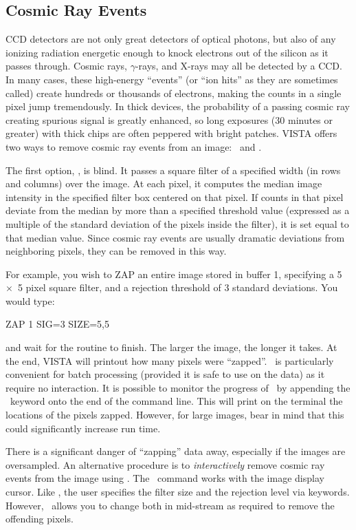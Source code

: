 \subsection{Cosmic Ray Events}
\label{sec:imcosrays}
CCD detectors are not only great detectors of optical photons, but also of any
ionizing radiation energetic enough to knock electrons out of the silicon as
it passes through.  Cosmic rays, $\gamma$-rays, and X-rays may all be detected
by a CCD.  In many cases, these high-energy ``events'' (or ``ion hits'' as
they are sometimes called) create hundreds or thousands of electrons, making
the counts in a single pixel jump tremendously.  In thick devices, the
probability of a passing cosmic ray creating spurious signal is greatly
enhanced, so long exposures (30 minutes or greater) with thick chips are often
peppered with bright patches. VISTA offers two ways to remove cosmic ray
events from an image: \ and . 

The first option, , is blind.  It passes a square filter of a
specified width (in rows and columns) over the image.  At each pixel, it
computes the median image intensity in the specified filter box centered on
that pixel.  If counts in that pixel deviate from the median by more than a
specified threshold value (expressed as a multiple of the standard deviation
of the pixels inside the filter), it is set equal to that median value. Since
cosmic ray events are usually dramatic deviations from neighboring pixels,
they can be removed in this way. 

For example, you wish to ZAP an entire image stored in buffer 1, specifying a
5~$\times$~5 pixel square filter, and a rejection threshold of 3 standard
deviations.  You would type: 
\begin{command}
      \item ZAP 1 SIG=3 SIZE=5,5
\end{command}
and wait for the routine to finish.  The larger the image, the longer it
takes.  At the end, VISTA will printout how many pixels were ``zapped''. 
\ is particularly convenient for batch processing (provided it
is safe to use on the data) as it require no interaction.  It is possible to
monitor the progress of \ by appending the \ keyword
onto the end of the command line.  This will print on the terminal the
locations of the pixels zapped.  However, for large images, bear in mind
that this could significantly increase run time.

There is a significant danger of ``zapping'' data away, especially if the
images are oversampled. An alternative procedure is to {\it interactively}
remove cosmic ray events from the image using .  The \
command works with the image display cursor.  Like , the user
specifies the filter size and the rejection level via keywords.  However,
\comm{TVZAP}\ allows you to change both in mid-stream as required to remove
the offending pixels. 

